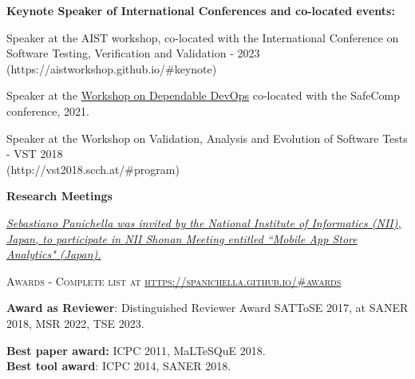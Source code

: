 \documentclass[11pt]{article}
\begin{document}
\medskip 
\textbf{Keynote Speaker of International Conferences and co-located events:}
\begin{innerlist}
\item Speaker at the AIST workshop, co-located with the International Conference on Software Testing, Verification and Validation - 2023  \\(https://aistworkshop.github.io/\#keynote) 
\item Speaker at the \href{https://safecomp2021.hosted.york.ac.uk/wp-content/uploads/2021/08/DepDevOps_2021_programme.pdf}{Workshop on Dependable DevOps} co-located with the SafeComp conference, 2021.
\item Speaker at the Workshop on Validation, Analysis and Evolution of Software Tests - VST 2018  \\(http://vst2018.scch.at/\#program) 
\end{innerlist}
\medskip 
\textbf{Research Meetings}
\begin{innerlist}
   \item \emph{
              \href{http://www.nii.ac.jp/��}
                   {Sebastiano Panichella was invited by the \href{http://www.nii.ac.jp/}{National Institute of Informatics} (NII), Japan, to participate in \href{http://shonan.nii.ac.jp/shonan/}{NII Shonan Meeting entitled ``Mobile App Store Analytics"} (Japan).
}}


\end{innerlist}

\medskip\medskip\medskip

\vspace{-2.5mm}
\textsc{Awards - Complete list at \href{https://spanichella.github.io/\#awards}{https://spanichella.github.io/\#awards}}
\medskip

\textbf{Award as Reviewer}: Distinguished Reviewer Award SATToSE 2017, at SANER 2018, MSR 2022, TSE 2023.


\textbf{Best paper award:} ICPC 2011, MaLTeSQuE 2018.\\ 
\textbf{Best tool award}: ICPC 2014, SANER 2018. 
\end{document}
